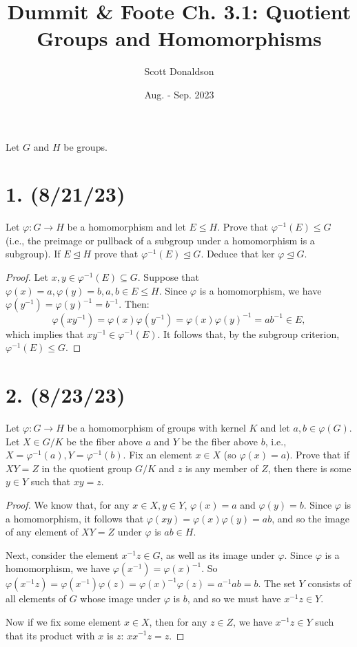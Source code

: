 \documentclass{article}
\title{Dummit \& Foote Ch. 3.1: Quotient Groups and Homomorphisms}
\author{Scott Donaldson}
\date{Aug. - Sep. 2023}
\begin{document}
\maketitle

Let $G$ and $H$ be groups.

\section*{1. (8/21/23)}

Let $\varphi: G \rightarrow H$ be a homomorphism and let $E \leq H$. Prove that $\varphi^{-1}(E) \leq G$ (i.e., the preimage or pullback of a subgroup under a homomorphism is a subgroup). If $E \unlhd H$ prove that $\varphi^{-1}(E) \unlhd G$. Deduce that ker $\varphi \unlhd G$. 

\begin{proof}
    Let $x, y \in \varphi^{-1}(E) \subseteq G$. Suppose that $\varphi(x) = a, \varphi(y) = b, a, b \in E \leq H$. Since $\varphi$ is a homomorphism, we have $\varphi(y^{-1}) = \varphi(y)^{-1} = b^{-1}$. Then:
    \begin{equation*}
        \varphi(xy^{-1}) = \varphi(x)\varphi(y^{-1}) = \varphi(x)\varphi(y)^{-1} = ab^{-1} \in E,
    \end{equation*}
    which implies that $xy^{-1} \in \varphi^{-1}(E)$. It follows that, by the subgroup criterion, $\varphi^{-1}(E) \leq G$.
\end{proof}

\section*{2. (8/23/23)}

Let $\varphi: G \rightarrow H$ be a homomorphism of groups with kernel $K$ and let $a, b \in \varphi(G)$. Let $X \in G/K$ be the fiber above $a$ and $Y$ be the fiber above $b$, i.e., $X = \varphi^{-1}(a), Y = \varphi^{-1}(b)$. Fix an element $x \in X$ (so $\varphi(x) = a$). Prove that if $XY = Z$ in the quotient group $G/K$ and $z$ is any member of $Z$, then there is some $y \in Y$ such that $xy = z$.

\begin{proof}
    We know that, for any $x \in X, y \in Y$, $\varphi(x) = a$ and $\varphi(y) = b$. Since $\varphi$ is a homomorphism, it follows that $\varphi(xy) = \varphi(x)\varphi(y) = ab$, and so the image of any element of $XY = Z$ under $\varphi$ is $ab \in H$.
    
    Next, consider the element $x^{-1}z \in G$, as well as its image under $\varphi$. Since $\varphi$ is a homomorphism, we have $\varphi(x^{-1}) = \varphi(x)^{-1}$. So $\varphi(x^{-1}z) = \varphi(x^{-1})\varphi(z) = \varphi(x)^{-1}\varphi(z) = a^{-1}ab = b$. The set $Y$ consists of all elements of $G$ whose image under $\varphi$ is $b$, and so we must have $x^{-1}z \in Y$.

    Now if we fix some element $x \in X$, then for any $z \in Z$, we have $x^{-1}z \in Y$ such that its product with $x$ is $z$: $x x^{-1}z = z$.
\end{proof}
\end{document}

